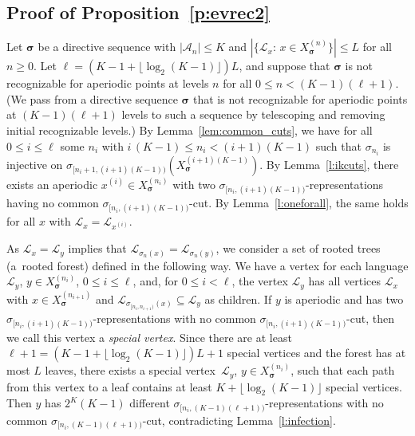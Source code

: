 \documentclass{amsart}
\theoremstyle{definition}
\theoremstyle{remark}
\numberwithin{equation}{section}
\begin{document}
\subsection{Proof  of Proposition~\ref{p:evrec2}} \label{sec:proof2} 
Let $\boldsymbol{\sigma}$ be a directive sequence with $|\mathcal{A}_n| \le K$ and $|\{\mathcal{L}_x:\, x \in X_{\boldsymbol{\sigma}}^{(n)}\}| \le L$ for all $n\ge0$. 
Let $\ell = (K-1 + \lfloor \log_2 (K-1) \rfloor)  L$, and suppose that $\boldsymbol{\sigma}$ is not recognizable for aperiodic points at levels $n$ for all $0 \le n < (K-1) (\ell+1)$. (We pass from a directive sequence $\boldsymbol{\sigma}$ that is not recognizable for aperiodic points at $(K-1) (\ell+1)$ levels to such a sequence by telescoping and removing initial recognizable levels.) By Lemma~\ref{lem:common_cuts}, we have for all $0 \le i \le \ell$ some $n_i$ with  $i\, (K-1) \le n_i < (i+1) (K-1)$ such that $\sigma_{n_i}$ is injective on $\sigma_{[n_i+1,(i+1)(K-1))}(X_{\boldsymbol{\sigma}}^{(i+1)(K-1)})$. 
By Lemma~\ref{l:ikcuts}, there exists an aperiodic $x^{(i)} \in X_{\boldsymbol{\sigma}}^{(n_i)}$ with two  $\sigma_{[n_i,(i+1)(K-1))}$-representations having no common $\sigma_{[n_i,(i+1)(K-1))}$-cut. 
By Lemma~\ref{l:oneforall}, the same holds for all $x$ with $\mathcal{L}_x = \mathcal{L}_{x^{(i)}}$. 

As $\mathcal{L}_x = \mathcal{L}_y$ implies that $\mathcal{L}_{\sigma_n(x)} = \mathcal{L}_{\sigma_n(y)}$, we consider a set of rooted trees (a~rooted forest) defined in the following way. 
We have a vertex for each language $\mathcal{L}_y$, $y \in X_{\boldsymbol{\sigma}}^{(n_i)}$, $0 \le i \le \ell$, and, for $0 \le i < \ell$, the vertex $\mathcal{L}_y$ has all vertices $\mathcal{L}_x$ with $x \in X_{\boldsymbol{\sigma}}^{(n_{i+1})}$ and $\mathcal{L}_{\sigma_{[n_i,n_{i+1})}(x)} \subseteq \mathcal{L}_y$ as children. 
If $y$ is aperiodic and has two $\sigma_{[n_i,(i+1)(K-1))}$-representations with no common $\sigma_{[n_i,(i+1)(K-1))}$-cut, then we call this vertex a \emph {special vertex}.
Since there are at least $\ell+1 = (K-1+\lfloor \log_2 (K-1) \rfloor)  L+1$ special vertices and the forest has at most $L$ leaves, there exists a special vertex~$\mathcal{L}_y$, $y \in X_{\boldsymbol{\sigma}}^{(n_i)}$, such that each path from this vertex to a leaf contains at least $K + \lfloor \log_2(K-1) \rfloor$ special vertices. 
Then $y$ has $2^K (K-1)$ different $\sigma_{[n_i,(K-1)(\ell+1))}$-representations with no common $\sigma_{[n_i,(K-1)(\ell+1))}$-cut, contradicting Lemma~\ref{l:infection}.
\end{document}

